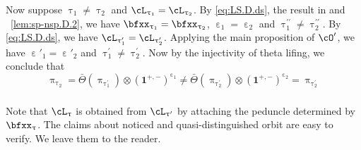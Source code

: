 \documentclass[12pt,a4paper]{amsart}
\newcommand{\bfone}{\mathbf{1}}
\numberwithin{equation}{section}
\theoremstyle{remark}
\def\Thetab{\bar{\Theta}}
\def\drc{\mathrm{DRC}}
\let\ytb=\ytableaushort
\def\cOp{\cO^{\prime}}
\def\cOpp{\cO^{\prime\prime}}
\def\uptaup{\uptau^{\prime}}
\def\uptaupp{\uptau^{\prime\prime}}
\begin{document}
Now suppose $\uptau_{1} \neq \uptau_{2}$ and
$\cL_{\uptau_{1}}=\cL_{\uptau_{2}}$. By \eqref{eq:LS.D.ds}, the result in
 and
~\eqref{lem:sp-nsp.D.2},
we have
$\bfxx_{\uptau_{1}}=\bfxx_{\uptau_{2}}$,  $\upepsilon_1=\upepsilon_{2}$ and
$\uptaupp_{1}\neq \uptaupp_{2}$.
By \eqref{eq:LS.D.ds}, we have
$\cL_{\uptaup_{1}}=\cL_{\uptaup_{2}}$.
Applying the main proposition of $\cOp$, we have
$\upepsilon'_{1}=\upepsilon'_{2}$ and $\uptaup_{1}\neq \uptaup_{2}$.
Now by the injectivity of theta lifing, we conclude that
\[
  \uppi_{\uptau_{2}} = \Thetab(\uppi_{\uptaup_{1}})\otimes (\bfone^{+,-})^{\upepsilon_{1}}
  \neq \Thetab(\uppi_{\uptaup_{2}})\otimes (\bfone^{+,-})^{\upepsilon_{2}} = \uppi_{\uptaup_{2}}
\]

\subsubsection{}

Note that $\cL_{\uptau}$ is obtained from $\cL_{\uptaup}$ by attaching the peduncle
determined by $\bfxx_{\uptau}$. The claims about noticed and
quasi-distinguished orbit are easy to verify. We leave them to the reader.





\end{document}
